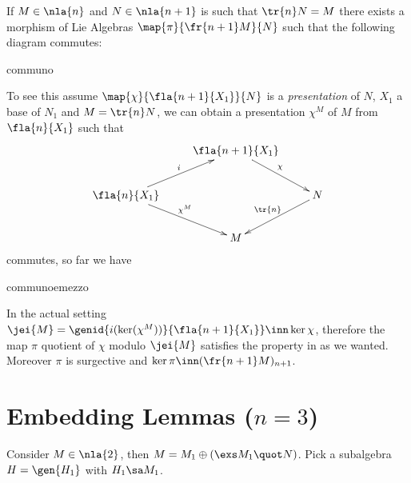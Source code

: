 If $M\in\nla{n}$ and %
$N\in\nla{n+1}$ is such that $\tr{n}N=M$ there exists a morphism of Lie Algebras $\map{\pi}{\fr{n+1}M}{N}$ such that the following diagram commutes:
\begin{labeq}{communo}
\end{labeq}
To see this assume $\map{\chi}{\fla{n+1}{X_1}}{N}$ is a \emph{presentation} of $N$, $X_1$ a base of $N_1$ and $M=\tr{n}N$, we can obtain a presentation $\chi^M$ of $M$ from $\fla{n}{X_1}$ such that
$$\xymatrix{&\fla{n+1}{X_1}%
\ar[dr]^{\chi}&\\\fla{n}{X_1}\ar[ur]^{i}\ar[dr]^{\chi^M}&&N\ar[dl]_{\tr{n}}\\&M&}$$
commutes, so far we have
\begin{labeq}{communoemezzo}
\end{labeq}

In the actual setting $\jei{M}=\genid{i(\ker(\chi^{M}))}{\fla{n+1}{X_{1}}}\inn\ker\chi$, therefore the map $\pi$ quotient of $\chi$ modulo $\jei{M}$
satisfies the property in  as we wanted.
Moreover $\pi$ is surgective and $\ker\pi\inn(\fr{n+1}M)_{n+1}$.
\section{Embedding Lemmas ($n=3$)}\label{emblem}
Consider $M\in\nla{2}$, then $M=M_1\oplus\left(\exs M_1\quot N\right)$.
Pick a subalgebra $H=\gen{H_1}$ with $H_1\sa M_1$.

